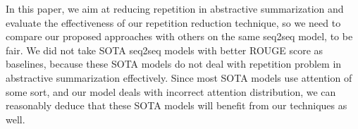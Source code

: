 In this paper, we aim at reducing repetition in abstractive summarization
and evaluate the
effectiveness of our repetition reduction technique, so we need to compare our proposed
approaches with others on the same seq2seq model, to be fair. 
We did not take SOTA seq2seq models with better ROUGE score as baselines, because
these SOTA models do not deal with repetition problem in abstractive
summarization effectively. 
Since most SOTA models use attention of some sort, and our model deals
with incorrect attention distribution, we can reasonably deduce that these SOTA models
will benefit from our techniques as well. 


